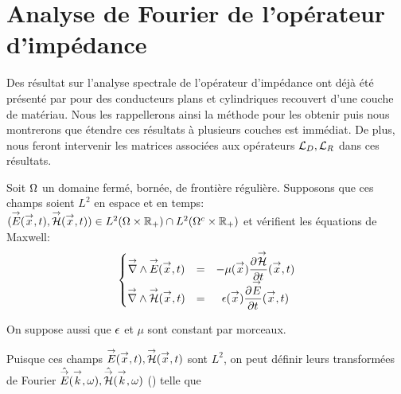 \section{Analyse de Fourier de l'opérateur d'impédance}

Des résultat sur l'analyse spectrale de l'opérateur d'impédance ont déjà été présenté par \cite{hoppe_impedance_1995} pour des conducteurs plans et cylindriques recouvert d'une couche de matériau.
Nous les rappellerons ainsi la méthode pour les obtenir puis nous montrerons que étendre ces résultats à plusieurs couches est immédiat. De plus, nous feront intervenir les matrices associées aux opérateurs \(\LD,\LR\) dans ces résultats.


Soit \(\OO\) un domaine fermé, bornée, de frontière régulière. Supposons que ces champs soient \(L^2\) en espace et en temps: \((\vE(\vect{x},t),\vH(\vect{x},t)) \in L^2(\OO \times \RR_+) \cap L^2(\OO^c\times\RR_+)\) et vérifient les équations de Maxwell:
\begin{equation}
    \left\lbrace
    \begin{matrix}
    \vrot \vE(\vect{x},t) &=& -\mu(\vx) \ddr{t}{\vH}(\vx,t) \\
    \vrot \vH(\vect{x},t) &=& \eps(\vx) \ddr{t}{\vE}(\vx,t)
    \end{matrix}
    \right.
\end{equation}

On suppose aussi que \(\eps\) et \(\mu\) sont constant par morceaux.

Puisque ces champs \(\vE(\vect{x},t),\vH(\vect{x},t)\) sont \(L^2\), on peut définir leurs transformées de Fourier \(\hat{\vE}(\vect{k},\w), \hat{\vH}(\vect{k},\w)\) (\cite[Théorème de Plancherel, p.~153]{yosida_functional_1995}) telle que

